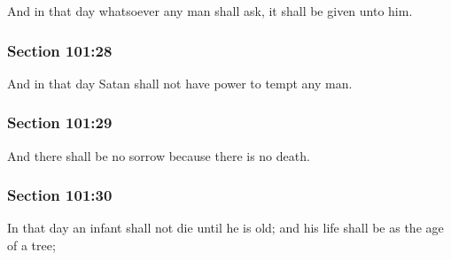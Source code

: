 		And in that day whatsoever any man shall ask, it shall be given unto him.


	\subsubsection{Section 101:28} %
		\label{DC101-28}

		And in that day Satan shall not have power to tempt any man.


	\subsubsection{Section 101:29} %
		\label{DC101-29}

		And there shall be no sorrow because there is no death.


	\subsubsection{Section 101:30} %
		\label{DC101-30}

		In that day an infant shall not die until he is old; and his life shall be as the age of a tree;


